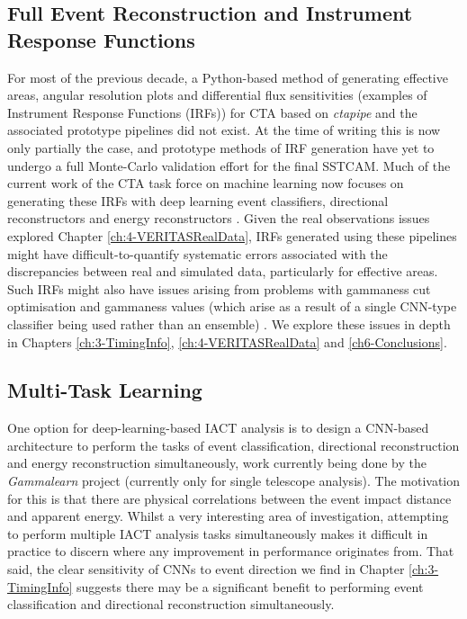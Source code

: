 \subsection{Full Event Reconstruction and Instrument Response Functions}
For most of the previous decade, a Python-based method of generating effective areas, angular resolution plots and differential flux sensitivities (examples of Instrument Response Functions (IRFs)) for CTA based on \textit{ctapipe} and the associated prototype pipelines did not exist. At the time of writing this is now only partially the case, and prototype methods of IRF generation have yet to undergo a full Monte-Carlo validation effort for the final SSTCAM. Much of the current work of the CTA task force on machine learning now focuses on generating these IRFs with deep learning event classifiers, directional reconstructors and energy reconstructors \cite{tjarkicrc}. Given the real observations issues explored Chapter \ref{ch:4-VERITASRealData}, IRFs generated using these pipelines might have difficult-to-quantify systematic errors associated with the discrepancies between real and simulated data, particularly for effective areas. Such IRFs might also have issues arising from problems with gammaness cut optimisation and gammaness values (which arise as a result of a single CNN-type classifier being used rather than an ensemble) \cite{mike}. We explore these issues in depth in Chapters \ref{ch:3-TimingInfo}, \ref{ch:4-VERITASRealData} and \ref{ch6-Conclusions}.

\subsection{Multi-Task Learning}

One option for deep-learning-based IACT analysis is to design a CNN-based architecture to perform the tasks of event classification, directional reconstruction and energy reconstruction simultaneously, work currently being done by the \textit{Gammalearn} project \cite{mikaelphd} (currently only for single telescope analysis). The motivation for this is that there are physical correlations between the event impact distance and apparent energy. Whilst a very interesting area of investigation, attempting to perform multiple IACT analysis tasks simultaneously makes it difficult in practice to discern where any improvement in performance originates from. That said, the clear sensitivity of CNNs to event direction we find in Chapter \ref{ch:3-TimingInfo} suggests there may be a significant benefit to performing event classification and directional reconstruction simultaneously.

